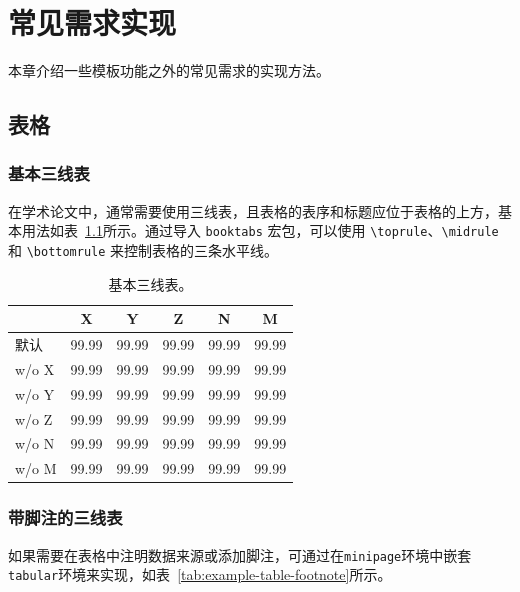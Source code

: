 \chapter{常见需求实现}
本章介绍一些模板功能之外的常见需求的实现方法。
 
\section{表格}
\label{sec:table}

\subsection{基本三线表}
在学术论文中，通常需要使用三线表，且表格的表序和标题应位于表格的上方，基本用法如表~\ref{tab:example-table-basic}所示。通过导入 \verb|booktabs| 宏包，可以使用 \verb|\toprule|、\verb|\midrule| 和 \verb|\bottomrule| 来控制表格的三条水平线。

\begin{table}[htb]
    \centering
    \caption{基本三线表。}
    \label{tab:example-table-basic}
    \begin{small}
    \begin{tabular}{@{}lccccc@{}}
        \toprule[1.5pt]
        & \textbf{X} & \textbf{Y} & \textbf{Z} & \textbf{N} & \textbf{M} \\
        \midrule[1pt]
        默认        & 99.99 & 99.99 & 99.99 & 99.99 & 99.99 \\
        \quad w/o X   & 99.99 & 99.99 & 99.99 & 99.99 & 99.99 \\
        \quad w/o Y   & 99.99 & 99.99 & 99.99 & 99.99 & 99.99 \\
        \quad w/o Z   & 99.99 & 99.99 & 99.99 & 99.99 & 99.99 \\
        \quad w/o N   & 99.99 & 99.99 & 99.99 & 99.99 & 99.99 \\
        \quad w/o M   & 99.99 & 99.99 & 99.99 & 99.99 & 99.99 \\
        \bottomrule[1.5pt]
    \end{tabular}
    \end{small}
\end{table}

\subsection{带脚注的三线表}
如果需要在表格中注明数据来源或添加脚注，可通过在\texttt{minipage}环境中嵌套\texttt{tabular}环境来实现，如表~\ref{tab:example-table-footnote}所示。

